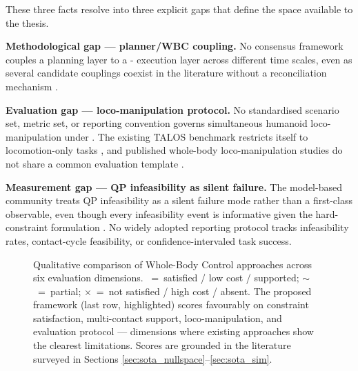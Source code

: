 These three facts resolve into three explicit gaps that define the space
available to the thesis.

\begin{researchgap}
\textbf{Methodological gap --- planner/WBC coupling.} No consensus
framework couples a planning layer to a \QP-\WBC{} execution layer
across different time scales, even as several candidate couplings
coexist in the literature without a reconciliation mechanism
\cite{Romualdi2023,Sleiman2021,Smaldone2025,LeCleach2024}.
\end{researchgap}

\begin{researchgap}
\textbf{Evaluation gap --- loco-manipulation protocol.} No standardised
scenario set, metric set, or reporting convention governs simultaneous
humanoid loco-manipulation under \WBC{}. The existing TALOS benchmark
restricts itself to locomotion-only tasks \cite{Fernbach2018}, and
published whole-body loco-manipulation studies do not share a common
evaluation template \cite{Sleiman2021}.
\end{researchgap}

\begin{researchgap}
\textbf{Measurement gap --- QP infeasibility as silent failure.} The
model-based community treats QP infeasibility as a silent failure mode
rather than a first-class observable, even though every infeasibility
event is informative given the hard-constraint formulation
\cite{Wensing2013,Koolen2016}. No widely adopted reporting protocol
tracks infeasibility rates, contact-cycle feasibility, or
confidence-intervaled task success.
\end{researchgap}


\begin{figure}[htbp]
  \centering
  
  \caption{Qualitative comparison of Whole-Body Control approaches across
           six evaluation dimensions.
           \checkmark~=~satisfied / low cost / supported;
           $\sim$~=~partial;
           $\times$~=~not satisfied / high cost / absent.
           The proposed framework (last row, highlighted) scores
           favourably on constraint satisfaction, multi-contact support,
           loco-manipulation, and evaluation protocol — dimensions where
           existing approaches show the clearest limitations.
           Scores are grounded in the literature surveyed in Sections
           \ref{sec:sota_nullspace}--\ref{sec:sota_sim}.}
  \label{fig:wbc_comparison}
\end{figure}

